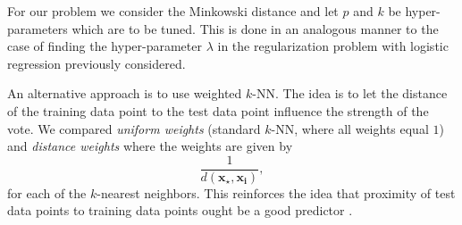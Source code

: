 \documentclass[../../project.tex]{subfiles}
\begin{document}
	For our problem we consider the Minkowski distance and let $p$ and $k$ be hyper-parameters which are to be tuned. This is done in an analogous manner to the case of finding the hyper-parameter $\lambda$ in the regularization problem with logistic regression previously considered.
	
	
	An alternative approach is to use weighted $k$-NN. The idea is to let the distance of the training data point to the test data point influence the strength of the vote. We compared \textit{uniform weights} (standard $k$-NN, where all weights equal $1$) and \textit{distance weights} where the weights are given by 
	\begin{equation}
	\dfrac{1}{d(\boldsymbol{x_{\star}, \boldsymbol{x_i}})}, 
	\end{equation}
	for each of the $k$-nearest neighbors. This reinforces the idea that proximity of test data points to training data points ought be a good predictor \citep{sklearn2}.
\end{document}
